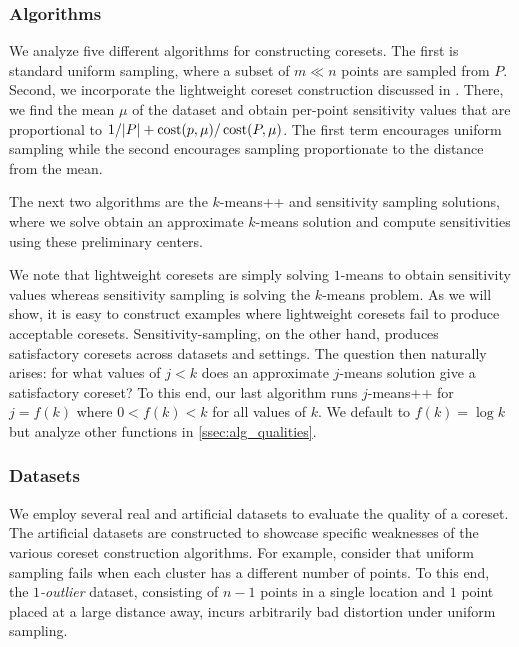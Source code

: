 

\subsubsection{Algorithms}

We analyze five different algorithms for constructing coresets. The first is standard uniform sampling, where a subset of $m \ll n$ points are sampled from $P$.
Second, we incorporate the lightweight coreset construction discussed in \cite{lightweight_coresets}. There, we find the mean $\mu$ of the dataset and obtain
per-point sensitivity values that are proportional to $1/|P| + \operatorname{cost}(p, \mu) / \operatorname{cost}(P, \mu)$. The first term encourages uniform sampling while the second
encourages sampling proportionate to the distance from the mean.

The next two algorithms are the $k$-means++ and \fkmeans sensitivity sampling solutions, where we solve obtain an approximate $k$-means solution and
compute sensitivities using these preliminary centers.

We note that lightweight coresets are simply solving $1$-means to obtain sensitivity values whereas sensitivity sampling is solving the $k$-means problem.  As
we will show, it is easy to construct examples where lightweight coresets fail to produce acceptable coresets. Sensitivity-sampling, on the other hand, produces
satisfactory coresets across datasets and settings. The question then naturally arises: for what values of $j < k$ does an approximate $j$-means solution give
a satisfactory coreset? To this end, our last algorithm runs $j$-means++ for $j = f(k)$ where $0 < f(k) < k$ for all values of $k$. We default to $f(k) = \log
k$ but analyze other functions in \ref{ssec:alg_qualities}.

\subsubsection{Datasets}

We employ several real and artificial datasets to evaluate the quality of a coreset.  The artificial datasets are constructed to showcase specific weaknesses of
the various coreset construction algorithms. For example, consider that uniform sampling fails when each cluster has a different number of points. To this end,
the \emph{$1$-outlier} dataset, consisting of $n-1$ points in a single location and $1$ point placed at a large distance away, incurs arbitrarily bad distortion
under uniform sampling. 

